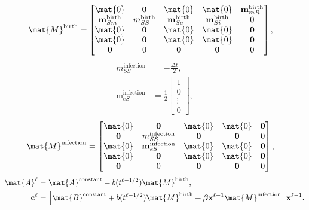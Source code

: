 \documentclass{jpmarticle}
\renewcommand{\vec}[1]{\boldsymbol{\mathrm{#1}}}
\begin{document}
\begin{equation}
  \begin{split}
    \mat{M}^{\text{birth}} &=
    \begin{bmatrix}
      \mat{0} & \vec{0} & \mat{0} & \mat{0} & \vec{m}_{mR}^{\text{birth}}
      \\
      \vec{m}_{Sm}^{\text{birth}} & m_{SS}^{\text{birth}} &
      \vec{m}_{Se}^{\text{birth}} & \vec{m}_{Si}^{\text{birth}} & 0
      \\
      \mat{0} & \vec{0} & \mat{0} & \mat{0} & \vec{0}
      \\
      \mat{0} & \vec{0} & \mat{0} & \mat{0} & \vec{0}
      \\
      \vec{0} & 0 & \vec{0} & \vec{0} & 0
    \end{bmatrix},
  \end{split}
\end{equation}
\begin{equation}
  \begin{split}
    m_{SS}^{\text{infection}} &=
    - \frac{\Delta t}{2},
    \\
    \vec{m}_{eS}^{\text{infection}} &=
    \frac{1}{2}
    \begin{bmatrix}
      1 \\ 0 \\ \vdots \\ 0
    \end{bmatrix},
  \end{split}
\end{equation}
\begin{equation}
  \begin{split}
    \mat{M}^{\text{infection}} &=
    \begin{bmatrix}
      \mat{0} & \vec{0} & \mat{0} & \mat{0} & \vec{0}
      \\
      \vec{0} & m_{SS}^{\text{infection}} & \vec{0} & \vec{0} & 0
      \\
      \mat{0} & \vec{m}_{eS}^{\text{infection}} & \mat{0} & \mat{0} & \vec{0}
      \\
      \mat{0} & \vec{0} & \mat{0} & \mat{0} & \vec{0}
      \\
      \vec{0} & 0 & \vec{0} & \vec{0} & 0
    \end{bmatrix},
  \end{split}
\end{equation}
\begin{equation}
  \begin{split}
    \mat{A}^{\ell} &=
    \mat{A}^{\text{constant}}
    - b(t^{\ell - 1 / 2}) \mat{M}^{\text{birth}},
    \\
    \vec{c}^{\ell} &=
    \left[
      \mat{B}^{\text{constant}}
      + b(t^{\ell - 1 / 2}) \mat{M}^{\text{birth}}
      + \vec{\beta} \vec{x}^{\ell - 1} \mat{M}^{\text{infection}}
    \right] \vec{x}^{\ell - 1}.
  \end{split}
\end{equation}
\end{document}
